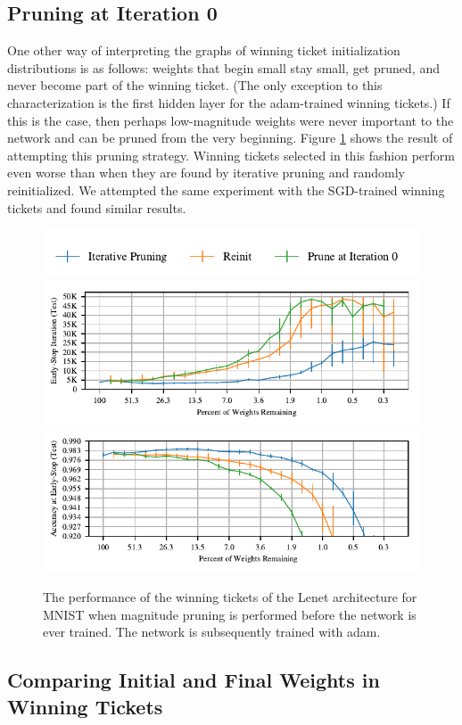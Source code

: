 \subsection{Pruning at Iteration 0}

One other way of interpreting the graphs of winning ticket initialization distributions is as follows: weights that begin small stay small, get pruned, and never
become part of the winning ticket. (The only exception to this characterization is the first hidden layer for the adam-trained winning tickets.) If this is the case, then
perhaps low-magnitude weights were never important to the network and can be pruned from the very beginning. Figure \ref{fig:prune-at-iteration-zero} shows the
result of attempting this pruning strategy. Winning tickets selected in this fashion perform even worse than when they are found by iterative pruning and randomly reinitialized.
We attempted the same experiment with the SGD-trained winning tickets and found similar results.

\begin{figure}
\centering
\includegraphics[width=.5\textwidth]{graphs/mnist/lenet/prune_early_vanilla/legend}
\includegraphics[width=.5\textwidth]{graphs/mnist/lenet/prune_early_vanilla/iteration}%
\includegraphics[width=.5\textwidth]{graphs/mnist/lenet/prune_early_vanilla/accuracy}
\caption{The performance of the winning tickets of the Lenet architecture for MNIST when magnitude pruning is performed before the network is ever trained. The
network is subsequently trained with adam.}
\label{fig:prune-at-iteration-zero}
\end{figure}

\subsection{Comparing Initial and Final Weights in Winning Tickets}

